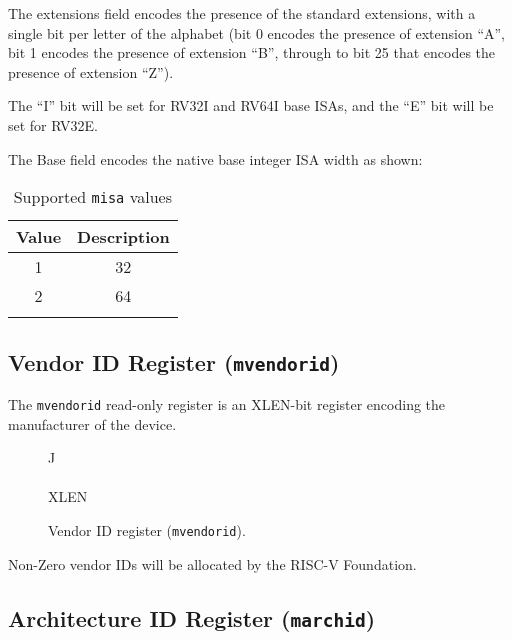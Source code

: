 \fi

The extensions field encodes the presence of the standard extensions,
with a single bit per letter of the alphabet (bit 0 encodes the presence
of extension ``A'', bit 1 encodes the presence of extension ``B'',
through to bit 25 that encodes the presence of extension ``Z'').

The ``I'' bit will be set for RV32I and RV64I base ISAs, and the ``E''
bit will be set for RV32E.

The Base field encodes the native base integer ISA width as shown:

\begin{longtable}[]{@{}cc@{}}
\toprule
Value & Description\tabularnewline
\midrule
\endhead
1 & 32\tabularnewline
2 & 64\tabularnewline
\bottomrule
\caption{Supported \texttt{misa} values}
\label{tab:misa-values}
\end{longtable}

\subsection{Vendor ID Register (\texttt{mvendorid})}\label{vendor-id-register-mvendorid}

The \texttt{mvendorid} read-only register is an XLEN-bit register encoding the
manufacturer of the device.

\ifdefined\MARKDOWN
\else

\begin{figure*}[htb]
	{\footnotesize
		\begin{center}
			\begin{tabular}{J}
				 \\
				\hline
				 \\
				\hline
				XLEN \\
			\end{tabular}
		\end{center}
	}
	\vspace{-0.1in}
	\caption{Vendor ID register (\texttt{mvendorid}).}
	\label{fig:mvendorreg}
\end{figure*}

\fi

Non-Zero vendor IDs will be allocated by the RISC-V Foundation.

\subsection{Architecture ID Register
(\texttt{marchid})}\label{architecture-id-register-marchid}

